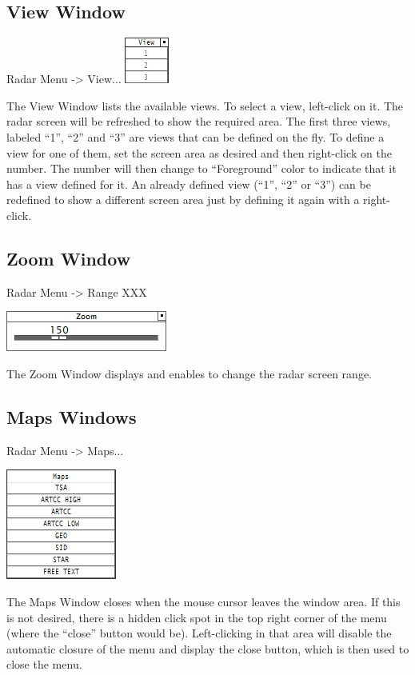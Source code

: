 \documentclass[11pt,a4paper]{memoir}
\begin{document}
\subsection{View Window}
\label{win:view}
Radar Menu -> View...
\includegraphics{img/viewmenu.png}

The View Window lists the available views. To select a view, left-click on it. The radar screen will be refreshed to show the required area. The first three views, labeled “1”, “2” and “3” are views that can be defined on the fly. To define a view for one of them, set the screen area as desired and then right-click on the number. The number will then change to “Foreground” color to indicate that it has a view defined for it. An already defined view (“1”, “2” or “3”) can be redefined to show a different screen area just by defining it again with a right-click.

\subsection{Zoom Window}
\label{win:zoom}
Radar Menu -> Range XXX

\includegraphics{img/zoom.png}

The Zoom Window displays and enables to change the radar screen range.

\subsection{Maps Windows}
\label{win:mapsw}

Radar Menu -> Maps...

\includegraphics{img/mapsmenu.png}

The Maps Window closes when the mouse cursor leaves the window area. If this is not desired, there is a
hidden click spot in the top right corner of the menu (where the “close” button would be). Left-clicking in
that area will disable the automatic closure of the menu and display the close button, which is then used to
close the menu.
\end{document}
